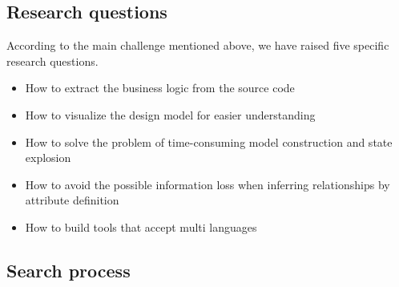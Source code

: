 \documentclass[acmsmall]{acmart}
\begin{document}
\subsection{Research questions}
According to the main challenge mentioned above, we have raised five specific research questions.
\begin{itemize}
\item  How to extract the business logic from the source code
\item  How to visualize the design model for easier understanding
\item  How to solve the problem of time-consuming model construction and state explosion
\item  How to avoid the possible information loss when inferring relationships by attribute definition
\item  How to build tools that accept multi languages
\end{itemize}

\subsection{Search process}
\end{document}
